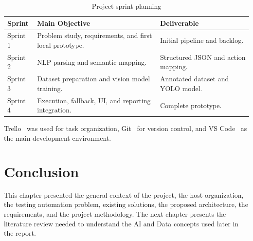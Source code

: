 \begin{table}[H]
	\centering
	\caption{Project sprint planning}
	\label{tab:sprint_planning_ch1}
	\renewcommand{\arraystretch}{1.25}
	\small
	\begin{tabularx}{\textwidth}{|l|X|X|}
		\hline
		\rowcolor{gray!20}
		\textbf{Sprint} & \textbf{Main Objective} & \textbf{Deliverable} \\ \hline
		Sprint 1 & Problem study, requirements, and first local prototype. & Initial pipeline and backlog. \\ \hline
		Sprint 2 & NLP parsing and semantic mapping. & Structured JSON and action mapping. \\ \hline
		Sprint 3 & Dataset preparation and vision model training. & Annotated dataset and YOLO model. \\ \hline
		Sprint 4 & Execution, fallback, UI, and reporting integration. & Complete prototype. \\ \hline
	\end{tabularx}
\end{table}

Trello~\cite{trello_platform} was used for task organization, Git~\cite{git_docs} for version control, and VS Code~\cite{vscode_docs} as the main development environment.

\section{Conclusion}
\label{sec:chapter1_conclusion}

This chapter presented the general context of the project, the host organization, the testing automation problem, existing solutions, the proposed architecture, the requirements, and the project methodology. The next chapter presents the literature review needed to understand the AI and Data concepts used later in the report.
